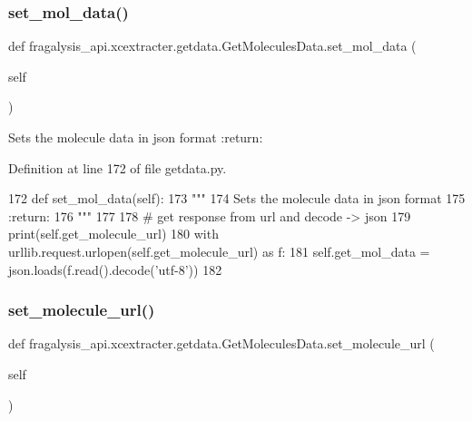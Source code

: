 \subsubsection{\texorpdfstring{set\+\_\+mol\+\_\+data()}{set\_mol\_data()}}
{\footnotesize\ttfamily def fragalysis\+\_\+api.\+xcextracter.\+getdata.\+Get\+Molecules\+Data.\+set\+\_\+mol\+\_\+data (\begin{DoxyParamCaption}\item[{}]{self }\end{DoxyParamCaption})}

\begin{DoxyVerb}Sets the molecule data in json format
:return:
\end{DoxyVerb}
 

Definition at line 172 of file getdata.\+py.


\begin{DoxyCode}
172     \textcolor{keyword}{def }set\_mol\_data(self):
173         \textcolor{stringliteral}{"""}
174 \textcolor{stringliteral}{        Sets the molecule data in json format}
175 \textcolor{stringliteral}{        :return:}
176 \textcolor{stringliteral}{        """}
177 
178         \textcolor{comment}{# get response from url and decode -> json}
179         print(self.get\_molecule\_url)
180         with urllib.request.urlopen(self.get\_molecule\_url) \textcolor{keyword}{as} f:
181             self.get\_mol\_data = json.loads(f.read().decode(\textcolor{stringliteral}{'utf-8'}))
182 
\end{DoxyCode}
\mbox{\label{classfragalysis__api_1_1xcextracter_1_1getdata_1_1_get_molecules_data_a61f7510bc705fab0ee33128872619f40}} 
\subsubsection{\texorpdfstring{set\+\_\+molecule\+\_\+url()}{set\_molecule\_url()}}
{\footnotesize\ttfamily def fragalysis\+\_\+api.\+xcextracter.\+getdata.\+Get\+Molecules\+Data.\+set\+\_\+molecule\+\_\+url (\begin{DoxyParamCaption}\item[{}]{self }\end{DoxyParamCaption})}

